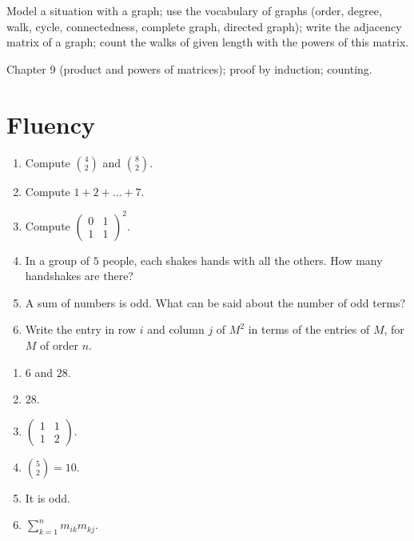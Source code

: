 
\begin{objectives}
Model a situation with a graph; use the vocabulary of graphs (order, degree, walk, cycle, connectedness, complete graph, directed graph); write the adjacency matrix of a graph; count the walks of given length with the powers of this matrix.
\end{objectives}
\begin{prerequisites}
Chapter 9 (product and powers of matrices); proof by induction; counting.
\end{prerequisites}

\section{Fluency}
\begin{fluency}
\begin{enumerate}
\item Compute $\binom 42$ and $\binom{8}{2}$.
\item Compute $1+2+\dots+7$.
\item Compute $\begin{pmatrix}0&1\\1&1\end{pmatrix}^2$.
\item In a group of $5$ people, each shakes hands with all the others. How many handshakes are there?
\item A sum of numbers is odd. What can be said about the number of odd terms?
\item Write the entry in row $i$ and column $j$ of $M^2$ in terms of the entries of $M$, for $M$ of order $n$.
\end{enumerate}
\end{fluency}
\begin{solution}[Fluency]
\begin{enumerate}
\item $6$ and $28$.
\item $28$.
\item $\begin{pmatrix}1&1\\1&2\end{pmatrix}$.
\item $\binom52=10$.
\item It is odd.
\item $\sum_{k=1}^{n}m_{ik}m_{kj}$.
\end{enumerate}
\end{solution}

